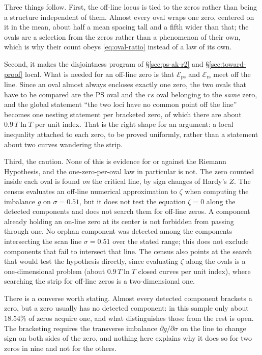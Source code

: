 \documentclass[11pt]{article}
\theoremstyle{definition}
\begin{document}
Three things follow. First, the off-line locus is tied to the zeros rather
than being a structure independent of them. Almost every oval wraps one zero, centered on
it in the mean, about half a mean spacing tall and a fifth wider than that; the ovals are a
selection from the zeros rather than a phenomenon of their own, which is why
their count obeys \eqref{eq:oval-ratio} instead of a law of its own.

Second, it makes the disjointness program of \S\ref{sec:ps-ak-r2} and
\S\ref{sec:toward-proof} local. What is needed for an off-line zero is that
$\mathcal{E}_{\mathrm{ps}}$ and $\mathcal{E}_{\mathrm{rs}}$ meet off the line.
Since an oval almost always encloses exactly one zero, the two ovals that have to be
compared are the PS oval and the $rs$ oval belonging to the \emph{same} zero,
and the global statement ``the two loci have no common point off the line''
becomes one nesting statement per bracketed zero, of which there are about
$0.9\,T\ln T$ per unit index. That is the right shape for an argument: a local
inequality attached to each zero, to be proved uniformly, rather than a
statement about two curves wandering the strip.

Third, the caution. None of this is evidence for or against the Riemann
Hypothesis, and the one-zero-per-oval law in particular is not. The zero counted
inside each oval is found \emph{on} the critical line, by sign changes of
Hardy's $Z$. The census evaluates an off-line numerical approximation to
$\zeta$ when computing the imbalance $g$ on $\sigma=0.51$, but it does not
test the equation $\zeta=0$ along the detected components and does not search
them for off-line zeros. A component already holding an on-line zero at its
center is not forbidden from passing through one. No orphan component was
detected among the components intersecting the scan line $\sigma=0.51$ over
the stated range; this does not exclude components that fail to intersect that
line. The census also points at the search that
would test the hypothesis directly, since evaluating $\zeta$ along the ovals is
a one-dimensional problem (about $0.9\,T\ln T$ closed curves per unit index),
where searching the strip for off-line zeros is a two-dimensional one.

There is a converse worth stating. Almost every detected component brackets a
zero, but a zero usually has no detected component: in this sample only about
$18.54\%$ of zeros acquire one, and what distinguishes those from the rest is
open. The bracketing requires the
transverse imbalance $\partial g/\partial\sigma$ on the line to change sign on
both sides of the zero, and nothing here explains why it does so for two zeros
in nine and not for the others.
\end{document}
